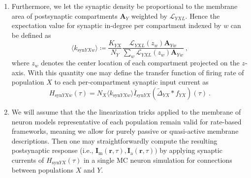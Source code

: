 \begin{enumerate}
\item Furthermore, we let the synaptic density be proportional to the membrane area of postsynaptic compartments $\mathbf{A}_Y$ weighted by $\mathcal{L}_{YXL}$.
Hence the expectation value for synaptic in-degree per compartment indexed by $w$ can be defined as
\begin{equation}
\langle k_{\text{syn}YXw} \rangle \coloneq \frac{K_{YX}}{N_Y} \frac{ \mathcal{L}_{YXL}(z_w) \mathbf{A}_{Yw}}{\sum_w \mathcal{L}_{YXL}(z_w) \mathbf{A}_{Yw}} ~,
\end{equation}
where $z_w$ denotes the center location of each compartment projected on the $z$-axis.
With this quantity one may define the transfer function  of firing rate of population $X$ to each per-compartment synaptic input current as
\begin{equation}
H_{\text{syn}YXw}(\tau) = N_X \langle k_{\text{syn}YXw} \rangle \overline{I}_{\text{syn}YX} \left( \widetilde{\Delta}_{YX} \ast f_{YX}\right)(\tau) ~.
\end{equation}

\item We will assume that the the linearization tricks applied to the membrane of neuron models representative of each population remain valid for rate-based frameworks,
meaning we allow for purely passive or quasi-active membrane descriptions.
Then one may straightforwardly compute the resulting postsynaptic response
(i.e., $\mathbf{I}_\text{m}(\mathbf{r}, \tau),{}\mathbf{I}_\text{a}(\mathbf{r}, \tau))$
by applying synaptic currents of $H_{\text{syn}YX}(\tau)$ in a single MC neuron simulation for connections between populations $X$ and $Y$.


\end{enumerate}
